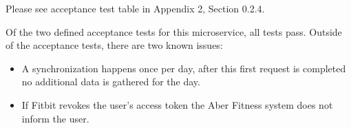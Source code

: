 Please see acceptance test table in Appendix 2, Section 0.2.4. 

Of the two defined acceptance tests for this microservice, all tests pass. Outside of the acceptance tests, there are two known issues:

\begin{itemize}
    \item A synchronization happens once per day, after this first request is completed no additional data is gathered for the day.
    \item If Fitbit revokes the user's access token the Aber Fitness system does not inform the user.
\end{itemize}

